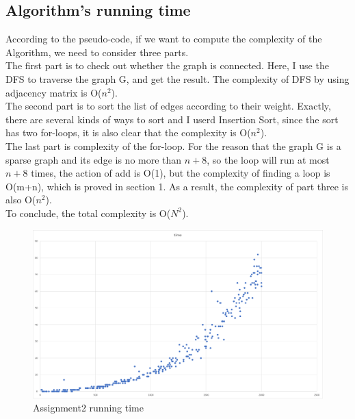 \documentclass[]{article}
\begin{document}
	\subsection{Algorithm's running time}
	According to the pseudo-code, if we want to compute the complexity of the Algorithm, we need to consider three parts.\\
	
	\noindent The first part is to check out whether the graph is connected. Here, I use the DFS to traverse the graph G, and get the result. The complexity of DFS by using adjacency matrix is O($n^{2}$). \\
	
	\noindent The second part is to sort the list of edges according to their weight. Exactly, there are several kinds of ways to sort and I userd Insertion Sort, since the sort has two for-loops, it is also clear that the complexity is O($n^{2}$).  \\
	
	\noindent The last part is complexity of the for-loop. For the reason that the graph G is a sparse graph and its edge is no more than $n+8$, so the loop will run at most $n+8$ times, the action of add is O(1), but the complexity of finding a loop is O(m+n), which is proved in section 1. As a result, the complexity of part three is also O($n^{2}$).\\
	
	\noindent To conclude, the total complexity is O($N^{2}$).  \\
	
	\begin{figure}[H]
		\centering
		\includegraphics[width=1.0\linewidth]{screen/Picture3}
		\caption{Assignment2 running time}
		\label{fig:function-of-size-and-running-time}
	\end{figure}
	
\end{document}
